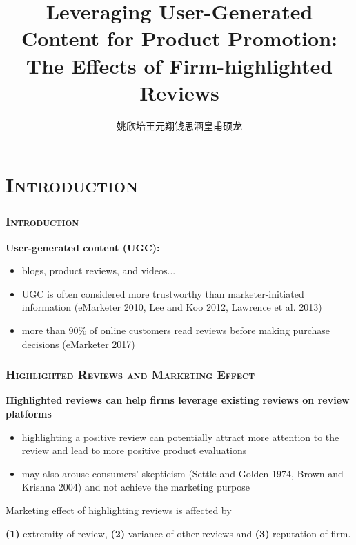 \documentclass{../presentation}
\title{Leveraging User-Generated Content for Product Promotion: The Effects of Firm-highlighted Reviews}
\author{姚欣培\;王元翔\;钱思涵\;皇甫硕龙}
\begin{document}
    \begin{frame}
        \maketitle
    \end{frame}
    \section{\textsc{Introduction}}
    \begin{frame}
        \frametitle{\textsc{Introduction}}

            \textbf{User-generated content (UGC): }
            \begin{itemize}
                \item blogs, product reviews, and videos...
                \item UGC is often considered more trustworthy than marketer-initiated information (eMarketer 2010, Lee and Koo 2012, Lawrence et al. 2013)
                \item more than 90\% of online customers read reviews before making purchase decisions (eMarketer 2017)
            \end{itemize}

    \end{frame}

    \begin{frame}
        \frametitle{\textsc{Highlighted Reviews and Marketing Effect}}

        \textbf{Highlighted reviews can help firms leverage existing reviews on review platforms}

        \begin{itemize}
            \item highlighting a positive review can potentially attract more attention to the review and lead to more positive product evaluations
            \item may also arouse consumers' skepticism (Settle and Golden 1974, Brown and Krishna 2004) and not achieve the marketing purpose
        \end{itemize}

        Marketing effect of highlighting reviews is affected by

        \textbf{(1)} extremity of review, \textbf{(2)} variance of other reviews and \textbf{(3)} reputation of firm.

    \end{frame}
\end{document}
